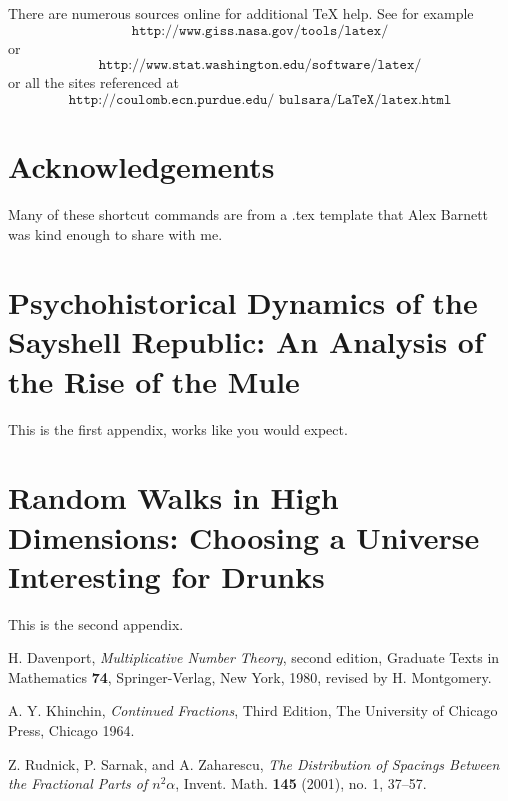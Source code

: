 \documentclass[12pt,reqno]{amsart}
\numberwithin{equation}{section}
\begin{document}
There are numerous sources online for additional TeX help. See for
example $$\texttt{http://www.giss.nasa.gov/tools/latex/}$$ or
$$\texttt{http://www.stat.washington.edu/software/latex/}$$ or all
the sites referenced at
$$\texttt{http://coulomb.ecn.purdue.edu/~bulsara/LaTeX/latex.html}$$

\newpage

\section*{Acknowledgements}

Many of these shortcut commands are from a .tex template that Alex
Barnett was kind enough to share with me.


\appendix

\section{Psychohistorical Dynamics of the Sayshell Republic: An Analysis of
the Rise of the Mule}\label{sec:sayshell}

This is the first appendix, works like you would expect.

\section{Random Walks in High Dimensions: Choosing a Universe Interesting
for Drunks}

This is the second appendix.









\begin{thebibliography}{9999}


\newblock H. Davenport, \emph{Multiplicative Number Theory}, second
edition, Graduate Texts in Mathematics \textbf{74},
Springer-Verlag, New York, 1980, revised by H. Montgomery.

\newblock A. Y. Khinchin, \emph{Continued Fractions},  Third
Edition, The University of Chicago Press, Chicago 1964.

\newblock Z. Rudnick, P. Sarnak, and A. Zaharescu, \emph{The
Distribution of Spacings Between the Fractional Parts of
$n^2\alpha$}, Invent. Math. \textbf{145} (2001), no. 1, 37--57.

\end{thebibliography}

\bigskip
\end{document}

